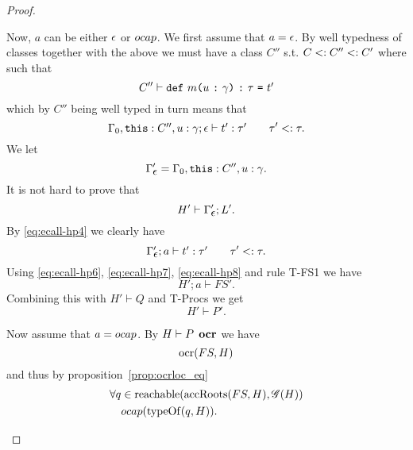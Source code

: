 \begin{proof}
\begin{description}
\begin{description}
          Now, $a$ can be either $\mbox{$\epsilon$}$ or $\mbox{$ocap$}$. We first assume that $a =
          \mbox{$\epsilon$}$.
          By well typedness of classes together with the above we must have a
          class $C''$ s.t. $C <: C'' <: C'$ where such that
          \begin{equation}
            C'' \vdash \mbox{\mdseries\texttt{def}~$m$\texttt{(}$u$~\texttt{:}~$\gamma$\texttt{)}~\texttt{:}~$\tau$~\texttt{=}~$t'$}
          \end{equation}
          which by $C''$ being well typed in turn means that
          \begin{equation} \label{eq:ecall-hp4}
            \mbox{$\Gamma_0,\mbox{\mdseries\texttt{this}}: C'', u: \gamma;\mbox{$\epsilon$}\vdash t':\tau'$}
            \quad\quad \tau' <: \tau.
          \end{equation}
          We let
          \begin{equation}
            \Gamma_{\mbox{$\epsilon$}}' = \Gamma_0, \mbox{\mdseries\texttt{this}}: C'', u: \gamma.
          \end{equation}
          It is not hard to prove that 
          \begin{equation} \label{eq:ecall-hp7}
            H' \vdash \Gamma_{\mbox{$\epsilon$}}'; L'.
          \end{equation}
          By \eqref{eq:ecall-hp4} we clearly have
          \begin{equation} \label{eq:ecall-hp8}
            \mbox{$\Gamma_{\mbox{$\epsilon$}}';a\vdash t':\tau'$} \quad\quad \tau' <: \tau.
          \end{equation}
          Using  \eqref{eq:ecall-hp6}, \eqref{eq:ecall-hp7},
          \eqref{eq:ecall-hp8} and rule {\sc T-FS1} we have
          \begin{equation}
            H';a \vdash FS'.
          \end{equation}
          Combining this with $H' \vdash Q$ and {\sc T-Procs} we get
          \begin{equation}
            H' \vdash P'.
          \end{equation}

          Now assume that $a = \mbox{$ocap$}$. By $H \vdash P \:\: \mbox{\bf ocr}$ we have
          \begin{equation}
            \mbox{$\mathrm{ocr}$}(FS, H)
          \end{equation}
          and thus by proposition~\ref{prop:ocrloc_eq}
          \begin{equation}
            \begin{aligned}
              \forall q &\in \mbox{$\mathrm{reachable}$}(\mbox{$\mathrm{accRoots}$}(FS, H), \mathscr{G}(H)) \\
              & \mbox{$ocap$}(\mbox{$\mathrm{typeOf}$}(q, H)).
            \end{aligned}
          \end{equation}
          

\end{description}
\end{description}
\end{proof}
